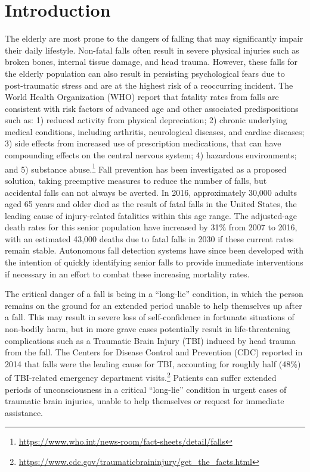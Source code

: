 \documentclass{llncs}
\begin{document}
\section{Introduction}

The elderly are most prone to the dangers of falling that may significantly impair their daily lifestyle. Non-fatal falls often result in severe physical injuries such as broken bones, internal tissue damage, and head trauma. However, these falls for the elderly population can also result in persisting psychological fears due to post-traumatic stress and are at the highest risk of a reoccurring incident. The World Health Organization (WHO) report that fatality rates from falls are consistent with risk factors of advanced age and other associated predispositions such as: 1) reduced activity from physical depreciation; 2) chronic underlying medical conditions, including arthritis, neurological diseases, and cardiac diseases; 3) side effects from increased use of prescription medications, that can have compounding effects on the central nervous system;  4) hazardous environments; and 5) substance abuse.\footnote{\url{https://www.who.int/news-room/fact-sheets/detail/falls}} Fall prevention has been investigated as a proposed solution, taking preemptive measures to reduce the number of falls, but accidental falls can not always be averted.  In 2016, approximately 30,000 adults aged 65 years and older died as the result of fatal falls in the United States, the leading cause of injury-related fatalities within this age range.\cite{burns2018deaths} The adjusted-age death rates for this senior population have increased by 31\% from 2007 to 2016, with an estimated 43,000 deaths due to fatal falls in 2030 if these current rates remain stable.\cite{burns2018deaths} Autonomous fall detection systems have since been developed with the intention of quickly identifying senior falls to provide immediate interventions if necessary in an effort to combat these increasing mortality rates.

	The critical danger of a fall is being in a ``long-lie'' condition, in which the person remains on the ground for an extended period unable to help themselves up after a fall.\cite{bagala2012evaluation} This may result in severe loss of self-confidence in fortunate situations of non-bodily harm, but in more grave cases potentially result in life-threatening complications such as a Traumatic Brain Injury (TBI) induced by head trauma from the fall. The Centers for Disease Control and Prevention (CDC) reported in 2014 that falls were the leading cause for TBI, accounting for roughly half (48\%) of TBI-related emergency department visits.\footnote{\url{https://www.cdc.gov/traumaticbraininjury/get_the_facts.html}} Patients can suffer extended periods of unconsciousness in a critical ``long-lie'' condition in urgent cases of traumatic brain injuries, unable to help themselves or request for immediate assistance. 
	
\end{document}
